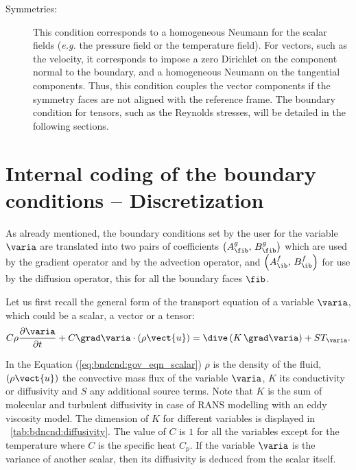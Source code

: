 \begin{description}
\item[Symmetries:] This condition corresponds to a homogeneous Neumann for the scalar fields
(\emph{e.g.} the pressure field or the temperature field). For vectors, such as the velocity, it corresponds
to impose a zero Dirichlet on the component normal to the boundary, and a homogeneous Neumann
on the tangential components. Thus, this condition couples the  vector components if the symmetry faces are not
aligned with the reference frame. The boundary condition for tensors, such as the Reynolds stresses, will be detailed in the following sections.
\end{description}

\section{Internal coding of the boundary conditions -- Discretization}

As already mentioned, the boundary conditions set by the user for the variable $\varia$
are translated into two pairs of coefficients $\left( A^g_\fib , \, B^g_\fib\right)$ which are used by the gradient operator and by the advection operator, and $\left( A^f_\ib , \, B^f_\ib\right)$ for use by the diffusion operator, this for all the boundary faces $\fib$.

Let us first recall the general form of the transport equation of a variable $\varia$, which could be a scalar,
a vector or a tensor:
\begin{equation}\label{eq:bndcnd:gov_eqn_scalar}
\displaystyle C \rho \frac{\partial \varia}{\partial t} + C \grad \varia \cdot \left( \rho \vect{u} \right) = \dive \left(\displaystyle K \, \grad \varia \right) +ST_\varia .
\end{equation}

In the Equation (\ref{eq:bndcnd:gov_eqn_scalar})
$\rho$ is the density of the fluid, $\left( \rho \vect{u} \right)$ the convective mass flux of the variable $\varia$, $K$ its
conductivity or diffusivity and $S$ any additional source terms.
Note that $K$ is the sum of molecular and turbulent diffusivity in case of RANS modelling with an eddy viscosity model.
The dimension of $K$ for different variables is displayed in \tablename~\ref{tab:bdncnd:diffusivity}.
The value of $C$ is $1$ for all the variables except for the temperature where $C$ is the specific heat $C_p$.
If the variable $\varia$ is the variance of another scalar, then its diffusivity
is deduced from the scalar itself.

